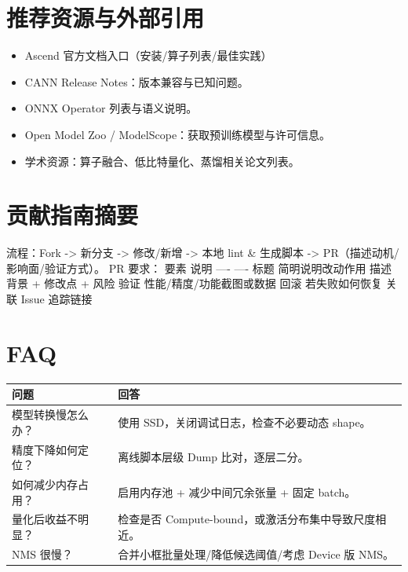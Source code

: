 \section{推荐资源与外部引用}\label{src-appendix-appendix6-h9}

\begin{itemize}
\tightlist
\item
  Ascend 官方文档入口（安装/算子列表/最佳实践）
\item
  CANN Release Notes：版本兼容与已知问题。
\item
  ONNX Operator 列表与语义说明。
\item
  Open Model Zoo / ModelScope：获取预训练模型与许可信息。
\item
  学术资源：算子融合、低比特量化、蒸馏相关论文列表。
\end{itemize}

\section{贡献指南摘要}\label{src-appendix-appendix6-h10}

流程：Fork -\textgreater{} 新分支 -\textgreater{} 修改/新增
-\textgreater{} 本地 lint \& 生成脚本 -\textgreater{}
PR（描述动机/影响面/验证方式）。 PR 要求： \textbar{} 要素 \textbar{}
说明 \textbar{} \textbar{} ---- \textbar{} ---- \textbar{} \textbar{}
标题 \textbar{} 简明说明改动作用 \textbar{} \textbar{} 描述 \textbar{}
背景 + 修改点 + 风险 \textbar{} \textbar{} 验证 \textbar{}
性能/精度/功能截图或数据 \textbar{} \textbar{} 回滚 \textbar{}
若失败如何恢复 \textbar{} \textbar{} 关联 Issue \textbar{} 追踪链接
\textbar{}

\section{FAQ}\label{src-appendix-appendix6-h11}

\begin{longtable}[]{@{}
  >{\raggedright\arraybackslash}p{}
  >{\raggedright\arraybackslash}p{}@{}}
\toprule\noalign{}
\begin{minipage}[b]{\linewidth}\raggedright
问题
\end{minipage} & \begin{minipage}[b]{\linewidth}\raggedright
回答
\end{minipage} \\
\midrule\noalign{}
\endhead
\bottomrule\noalign{}
\endlastfoot
模型转换慢怎么办？ & 使用 SSD，关闭调试日志，检查不必要动态 shape。 \\
精度下降如何定位？ & 离线脚本层级 Dump 比对，逐层二分。 \\
如何减少内存占用？ & 启用内存池 + 减少中间冗余张量 + 固定 batch。 \\
量化后收益不明显？ & 检查是否
Compute-bound，或激活分布集中导致尺度相近。 \\
NMS 很慢？ & 合并小框批量处理/降低候选阈值/考虑 Device 版 NMS。 \\
\end{longtable}

